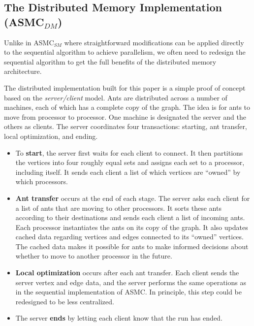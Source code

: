 \documentclass[11pt]{article}
\begin{document}



\subsection{The Distributed Memory Implementation (ASMC$_{DM}$)}\label{ASMC_dist} 

Unlike in ASMC$_{SM}$ where straightforward modifications can be applied directly to the sequential algorithm to achieve parallelism, we often need to redesign the sequential algorithm to get the full benefits of the distributed memory architecture. 

The distributed implementation built for this paper is a simple proof of concept based on the \textit{server/client} model.  Ants are distributed across a number of machines, each of which has a complete copy of the graph.  The idea is for ants to move from processor to processor.  One machine is designated the server and the others as clients.  The server coordinates four transactions: starting, ant transfer, local optimization, and ending.


\begin{itemize}

\item To {\bf start}, the server first waits for each client to connect.  It then partitions the vertices into four roughly equal sets and assigns each set to a processor, including itself.  It sends each client a list of which vertices are ``owned'' by which processors.

\item {\bf Ant transfer} occurs at the end of each stage.  The server asks each client for a list of ants that are moving to other processors.  It sorts these ants according to their destinations and sends each client a list of incoming ants.  Each processor instantiates the ants on its copy of the graph. It also updates cached data regarding vertices and edges connected to its ``owned'' vertices.  The cached data makes it possible for ants to make informed decisions about whether to move to another processor in the future.

\item {\bf Local optimization} occurs after each ant transfer.  Each client sends the server vertex and edge data, and the server performs the same operations as in the sequential implementation of ASMC.  In principle, this step could be redesigned to be less centralized.

\item The server {\bf ends} by letting each client know that the run has ended.  %

\end{itemize}
\end{document}
